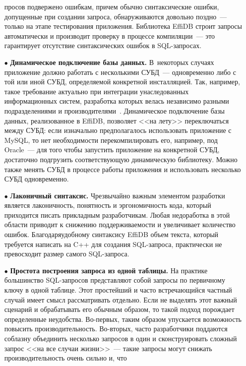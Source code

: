 \begin{multicols}{2}
\begin{itemize}
\noindent
про\-сов подвержено ошибкам, 
причем обычно синтаксические ошибки, допущенные при создании запроса, 
обнаруживаются довольно поздно~--- только на этапе тестирования приложения. 
Библиотека EffiDB строит запросы автоматически и производит проверку в процессе 
компиляции~--- это гарантирует отсутствие синтаксических ошибок в SQL-за\-просах.
\item[$\bullet$] \textbf{Динамическое подключение базы данных.} В~некоторых 
случаях приложение должно работать с несколькими СУБД~--- одновременно либо с 
той или иной СУБД, определяемой конкретной инсталляцией. Так, например, такое 
требование актуально при интеграции унаследованных информационных систем, 
разработка которых велась независимо разными подразделениями и 
производителями~\cite{2-y}. Динамическое подключение базы данных, реализованное 
в \mbox{EffiDB}, позволяет <<на лету>> переключаться между СУБД: если изначально 
предполагалось использовать приложение с MySQL, то нет необходимости 
перекомпилировать его, например, под Oracle~--- для того чтобы запустить 
приложение на конкретной СУБД, достаточно подгрузить соответствующую 
динамическую библиотеку. Можно также менять СУБД в процессе работы 
приложения и использовать несколько СУБД одновременно.
\item[$\bullet$] \textbf{Лаконичный синтаксис.} Чрезвычайно важным\linebreak
 элементом 
разработки является лаконичность, понятность и эргономичность кода, \mbox{который} 
приходится писать прикладным раз\-ра\-ботчи\-кам. Любая недоработка в этой области 
приводит к снижению поддерживаемости и увеличивает количество ошибок. 
Благодаря\linebreak удобному синтаксису EffiDB объем текста, который требуется написать на 
C++ для создания SQL-за\-про\-са, практически не превосходит размер самого 
SQL-за\-про\-са.
\item[$\bullet$] \textbf{Простота построения запроса из одной таблицы.} На 
практике большинство SQL-за\-про\-сов представляют собой запросы по первичному 
ключу в одной таблице. Этот простейший и часто встречающийся частный случай 
имеет смысл рассматривать отдельно. Если не выделять этот важный сценарий и 
обрабатывать его обычным образом, то такой подход порождает определенные 
неудобства. Во-пер\-вых, таким образом упускается возможность повысить 
производительность. Во-вто\-рых, часто разработчики поддаются соблазну объединить 
несколько запросов в один и сконструировать сложный запрос <<на все случаи 
жизни>>~--- такие запросы могут снижать производительность очень сильно и, что 

\end{itemize}
\end{multicols}
